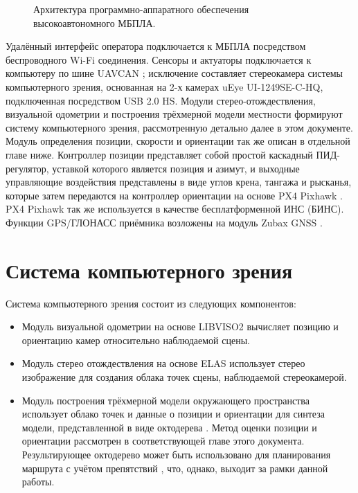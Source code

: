 \documentclass[12pt,a4paper]{article}
\begin{document}
\begin{figure}[!htbp]
    \centering
    
    \caption{\label{fig:arch}Архитектура программно-аппаратного обеспечения высокоавтономного МБПЛА.}
\end{figure}

Удалённый интерфейс оператора подключается к МБПЛА посредством беспроводного Wi-Fi соединения. Сенсоры и актуаторы подключается к компьютеру по шине UAVCAN \cite{UAVCAN}; исключение составляет стереокамера системы компьютерного зрения, основанная на 2-х камерах uEye UI-1249SE-C-HQ, подключенная посредством USB 2.0 HS. Модули стерео-отождествления, визуальной одометрии и построения трёхмерной модели местности формируют систему компьютерного зрения, рассмотренную детально далее в этом документе. Модуль определения позиции, скорости и ориентации так же описан в отдельной главе ниже. Контроллер позиции представляет собой простой каскадный ПИД-регулятор, уставкой которого является позиция и азимут, и выходные управляющие воздействия представлены в виде углов крена, тангажа и рысканья, которые затем передаются на контроллер ориентации на основе PX4 Pixhawk \cite{Pixhawk}. PX4 Pixhawk так же используется в качестве бесплатформенной ИНС (БИНС). Функции GPS/ГЛОНАСС приёмника возложены на модуль Zubax GNSS \cite{ZubaxGNSS}.

\newpage

\section{Система компьютерного зрения}

Система компьютерного зрения состоит из следующих компонентов:

\begin{itemize}
    \item Модуль визуальной одометрии на основе LIBVISO2 \cite{Geiger2011IV} вычисляет позицию и ориентацию камер относительно наблюдаемой сцены.
    \item Модуль стерео отождествления на основе ELAS \cite{Geiger10} использует стерео изображение для создания облака точек сцены, наблюдаемой стереокамерой.
    \item Модуль построения трёхмерной модели окружающего пространства использует облако точек и данные о позиции и ориентации для синтеза модели, представленной в виде октодерева \cite{rensselaer1980octree}. Метод оценки позиции и ориентации рассмотрен в соответствующей главе этого документа. Результирующее октодерево может быть использовано для планирования маршрута с учётом препятствий \cite{FraundorferHHLMTP12}, что, однако, выходит за рамки данной работы.
\end{itemize}
\end{document}
